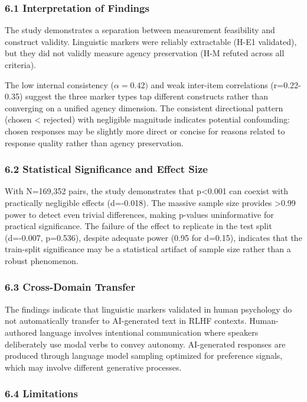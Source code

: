 
\subsubsection{6.1 Interpretation of Findings}

The study demonstrates a separation between measurement feasibility and construct validity. Linguistic markers were reliably extractable (H-E1 validated), but they did not validly measure agency preservation (H-M refuted across all criteria).

The low internal consistency ($\alpha =0.42)$ and weak inter-item correlations (r=0.22-0.35) suggest the three marker types tap different constructs rather than converging on a unified agency dimension. The consistent directional pattern (chosen < rejected) with negligible magnitude indicates potential confounding: chosen responses may be slightly more direct or concise for reasons related to response quality rather than agency preservation.

\subsubsection{6.2 Statistical Significance and Effect Size}

With N=169,352 pairs, the study demonstrates that p<0.001 can coexist with practically negligible effects (d=-0.018). The massive sample size provides >0.99 power to detect even trivial differences, making p-values uninformative for practical significance. The failure of the effect to replicate in the test split (d=-0.007, p=0.536), despite adequate power (0.95 for d=0.15), indicates that the train-split significance may be a statistical artifact of sample size rather than a robust phenomenon.

\subsubsection{6.3 Cross-Domain Transfer}

The findings indicate that linguistic markers validated in human psychology \citep{juanchich2017does} do not automatically transfer to AI-generated text in RLHF contexts. Human-authored language involves intentional communication where speakers deliberately use modal verbs to convey autonomy. AI-generated responses are produced through language model sampling optimized for preference signals, which may involve different generative processes.

\subsubsection{6.4 Limitations}

